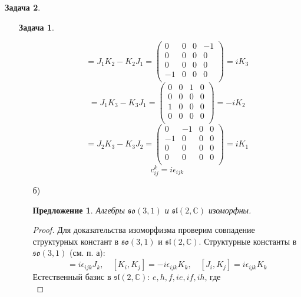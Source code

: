 \documentclass[12pt]{article}
\newtheorem{predl}[theorem]{Предложение}
\theoremstyle{definition}
\newtheorem{zad}{Задача}[section]
\begin{document}
\begin{zad}
\begin{itemize}
\begin{zad}
\begin{itemize}
    \begin{equation}
        [J_1,K_2]=J_1K_2-K_2J_1=\left(
    \begin{array}{cccc}
    0 & 0 & 0 & -1\\
    0 & 0 & 0 & 0\\
    0 & 0 & 0 & 0\\
    -1 & 0 & 0 & 0\\
    \end{array}
    \right)=iK_3
    \end{equation}
    \begin{equation}
        [J_1,K_3]=J_1K_3-K_3J_1=\left(
    \begin{array}{cccc}
    0 & 0 & 1 & 0\\
    0 & 0 & 0 & 0\\
    1 & 0 & 0 & 0\\
    0 & 0 & 0 & 0\\
    \end{array}
    \right)=-iK_2
    \end{equation}
    \begin{equation}
        [J_2,K_3]=J_2K_3-K_3J_2=\left(
    \begin{array}{cccc}
    0 & -1 & 0 & 0\\
    -1 & 0 & 0 & 0\\
    0 & 0 & 0 & 0\\
    0 & 0 & 0 & 0\\
    \end{array}
    \right)=iK_1
    \end{equation}
    \begin{equation}
        \boxed{c_{ij}^k=i\epsilon_{ijk}}
    \end{equation}
    \item[б)]
    \begin{predl}
    Алгебры $\mathfrak{so}(3,1)$ и $\mathfrak{sl}(2,\mathbb{C})$ изоморфны.
    \end{predl}
    \begin{proof}
        Для доказательства изоморфизма проверим совпадение структурных констант в $\mathfrak{so}(3,1)$ и $\mathfrak{sl}(2,\mathbb{C})$. Структурные константы в $\mathfrak{so}(3,1)$ (см. п. а):
        \begin{equation}
            [J_i,J_j]=i\epsilon_{ijk}J_k,\quad [K_i,K_j]=-i\epsilon_{ijk}K_k,\quad [J_i,K_j]=i\epsilon_{ijk}K_k
        \end{equation}
        Естественный базис в $\mathfrak{sl}(2,\mathbb{C})$: $e,h,f,ie,if,ih$, где
        \begin{equation}

\end{equation}
\end{proof}
\end{itemize}
\end{zad}
\end{itemize}
\end{zad}
\end{document}
